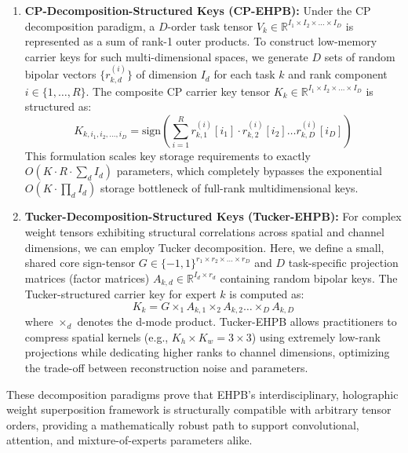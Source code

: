 \documentclass{article}
\theoremstyle{plain}
\theoremstyle{definition}
\theoremstyle{remark}
\begin{document}
\begin{enumerate}
\item \textbf{CP-Decomposition-Structured Keys (CP-EHPB):}
Under the CP decomposition paradigm, a $D$-order task tensor $V_k \in \mathbb{R}^{I_1 \times I_2 \times \dots \times I_D}$ is represented as a sum of rank-1 outer products. To construct low-memory carrier keys for such multi-dimensional spaces, we generate $D$ sets of random bipolar vectors $\{r_{k, d}^{(i)}\}$ of dimension $I_d$ for each task $k$ and rank component $i \in \{1, \dots, R\}$. The composite CP carrier key tensor $K_k \in \mathbb{R}^{I_1 \times I_2 \times \dots \times I_D}$ is structured as:
\begin{equation}
K_{k, i_1, i_2, \dots, i_D} = \text{sign} \left( \sum_{i=1}^R r_{k, 1}^{(i)}[i_1] \cdot r_{k, 2}^{(i)}[i_2] \dots r_{k, D}^{(i)}[i_D] \right)
\end{equation}
This formulation scales key storage requirements to exactly $O(K \cdot R \cdot \sum_d I_d)$ parameters, which completely bypasses the exponential $O(K \cdot \prod_d I_d)$ storage bottleneck of full-rank multidimensional keys.
\item \textbf{Tucker-Decomposition-Structured Keys (Tucker-EHPB):}
For complex weight tensors exhibiting structural correlations across spatial and channel dimensions, we can employ Tucker decomposition. Here, we define a small, shared core sign-tensor $G \in \{-1, 1\}^{r_1 \times r_2 \times \dots \times r_D}$ and $D$ task-specific projection matrices (factor matrices) $A_{k, d} \in \mathbb{R}^{I_d \times r_d}$ containing random bipolar keys. The Tucker-structured carrier key for expert $k$ is computed as:
\begin{equation}
K_k = G \times_1 A_{k, 1} \times_2 A_{k, 2} \dots \times_D A_{k, D}
\end{equation}
where $\times_d$ denotes the d-mode product. Tucker-EHPB allows practitioners to compress spatial kernels (e.g., $K_h \times K_w = 3 \times 3$) using extremely low-rank projections while dedicating higher ranks to channel dimensions, optimizing the trade-off between reconstruction noise and parameters.
\end{enumerate}

These decomposition paradigms prove that EHPB's interdisciplinary, holographic weight superposition framework is structurally compatible with arbitrary tensor orders, providing a mathematically robust path to support convolutional, attention, and mixture-of-experts parameters alike.
\end{document}
